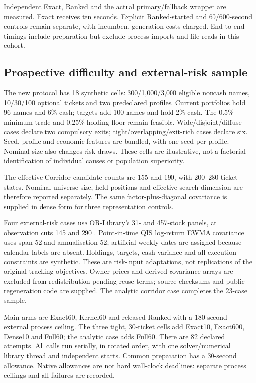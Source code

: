 \documentclass[preprint,12pt,authoryear]{elsarticle}
\begin{document}
Independent Exact, Ranked and the actual primary/fallback wrapper are measured.
Exact receives ten seconds. Explicit Ranked-started and 60/600-second controls
remain separate, with incumbent-generation costs charged. End-to-end timings
include preparation but exclude process imports and file reads in this cohort.

\subsection{Prospective difficulty and external-risk sample}
The new protocol has 18 synthetic cells: 300/1,000/3,000 eligible noncash names,
10/30/100 optional tickets and two predeclared profiles. Current portfolios
hold 96 names and 6\% cash; targets add 100 names and hold 2\% cash. The 0.5\%
minimum trade and 0.25\% holding floor remain feasible. Wide/disjoint/diffuse
cases declare two compulsory exits; tight/overlapping/exit-rich cases declare
six. Seed, profile and economic features are bundled, with one seed per profile.
Nominal size also changes risk draws. These cells are illustrative, not a
factorial identification of individual causes or population superiority.

The effective Corridor candidate counts are 155 and 190, with 200--280 ticket
states. Nominal universe size, held positions and effective search dimension
are therefore reported separately. The same factor-plus-diagonal covariance
is supplied in dense form for three representation controls.

Four external-risk cases use OR-Library's 31- and 457-stock panels, at
observation cuts 145 and 290 \citep{beasley2003,canakgoz2009,orlibrary}.
Point-in-time QIS log-return EWMA covariance uses span 52 and annualisation 52;
artificial weekly dates are assigned because calendar labels are absent.
Holdings, targets, cash variance and all execution constraints are synthetic.
These are risk-input adaptations, not replications of the original tracking
objectives. Owner prices and derived covariance arrays are excluded from
redistribution pending reuse terms; source checksums and public regeneration
code are supplied. The analytic corridor case completes the 23-case sample.

Main arms are Exact60, Kernel60 and released Ranked with a 180-second external
process ceiling. The three tight, 30-ticket cells add Exact10, Exact600,
Dense10 and Full60; the analytic case adds Full60. There are 82 declared
attempts. All calls run serially, in rotated order, with one solver/numerical
library thread and independent starts. Common preparation has a 30-second
allowance. Native allowances are not hard wall-clock deadlines: separate
process ceilings and all failures are recorded.
\end{document}

